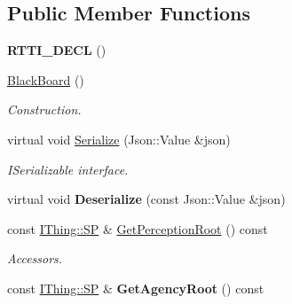 \subsection*{Public Member Functions}
\begin{DoxyCompactItemize}
\item 
\mbox{\label{class_black_board_adab334b501f4d17adf3b20395a65ca8a}} 
{\bfseries R\+T\+T\+I\+\_\+\+D\+E\+CL} ()
\item 
\mbox{\label{class_black_board_a34e2a107547d7217a7705d6c88058db3}} 
\hyperlink{class_black_board_a34e2a107547d7217a7705d6c88058db3}{Black\+Board} ()
\begin{DoxyCompactList}\small\item\em Construction. \end{DoxyCompactList}\item 
\mbox{\label{class_black_board_a7c0ededc79c06f51a4042392add4e964}} 
virtual void \hyperlink{class_black_board_a7c0ededc79c06f51a4042392add4e964}{Serialize} (Json\+::\+Value \&json)
\begin{DoxyCompactList}\small\item\em I\+Serializable interface. \end{DoxyCompactList}\item 
\mbox{\label{class_black_board_a263a37bd1fdbb46db6def0cd0503d0c5}} 
virtual void {\bfseries Deserialize} (const Json\+::\+Value \&json)
\item 
\mbox{\label{class_black_board_a13d70fb27ef59b83635fed85ced2d3eb}} 
const \hyperlink{class_i_thing_a6e95654aef6362c48b9a2fd44a1f970a}{I\+Thing\+::\+SP} \& \hyperlink{class_black_board_a13d70fb27ef59b83635fed85ced2d3eb}{Get\+Perception\+Root} () const
\begin{DoxyCompactList}\small\item\em Accessors. \end{DoxyCompactList}\item 
\mbox{\label{class_black_board_aa2baa55ec0fa21acc396add9e1ec4d1d}} 
const \hyperlink{class_i_thing_a6e95654aef6362c48b9a2fd44a1f970a}{I\+Thing\+::\+SP} \& {\bfseries Get\+Agency\+Root} () const
\item 
\mbox{\label{class_black_board_a17c8cf8fee4533eb0ac37a7a33e1d3aa}} 

\end{DoxyCompactItemize}
